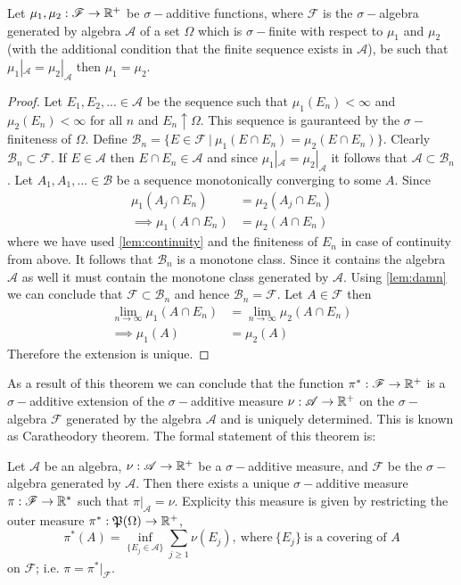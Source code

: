  \begin{theorem}
   Let $\mu_1, \mu_2: \mathscr{F} \to \mathbb{R}^+$ be $\sigma-$additive functions, where $ \mathscr{F}$ is the $\sigma-$algebra generated by algebra $ \mathscr{A}$ of a set $\Omega$ which is $\sigma-$finite with respect to $\mu_1$ and $\mu_2$ (with the additional condition that the finite sequence exists in $ \mathscr{A}$), be such that $\mu_1|_{ \mathscr{A}} = \mu_2|_{ \mathscr{A}}$ then $\mu_1 = \mu_2$. 
 \end{theorem}
 \begin{proof}
   Let $E_1, E_2,... \in \mathscr{A}$ be the sequence such that $\mu_1(E_n)<\infty$ and $\mu_2(E_n)<\infty$ for all $n$ and $E_n \uparrow \Omega$. This sequence is gauranteed by the $\sigma-$finiteness of $\Omega$. Define $ \mathscr{B}_n = \{E \in \mathscr{F}\ |\ \mu_1(E\cap E_n) = \mu_2(E\cap E_n)\}$. Clearly $ \mathscr{B}_n \subset \mathscr{F}$. If $E \in \mathscr{A}$ then $E\cap E_n \in \mathscr{A}$ and since $\mu_1|_{ \mathscr{A}} = \mu_2|_{ \mathscr{A}}$ it follows that $ \mathscr{A} \subset \mathscr{B}_n$. Let $A_1,A_1,...\in \mathscr{B}$ be a sequence monotonically converging to some $A$. Since
   \begin{align*}
     \mu_1(A_j\cap E_n) &= \mu_2(A_j\cap E_n)\\
     \implies \mu_1(A\cap E_n) &= \mu_2(A\cap E_n)
   \end{align*}
   where we have used \cref{lem:continuity} and the finiteness of $E_n$ in case of continuity from above. It follows that $ \mathscr{B}_n$ is a monotone class. Since it contains the algebra $ \mathscr{A}$ as well it must contain the monotone class generated by $ \mathscr{A}$. Using \cref{lem:damn} we can conclude that $ \mathscr{F}\subset \mathscr{B}_n$ and hence $ \mathscr{B}_n = \mathscr{F}$. Let $A\in \mathscr{F}$ then
   \begin{align*}
     \lim_{n\to \infty}\mu_1(A\cap E_n) &= \lim_{n\to\infty}\mu_2(A\cap E_n)\\
     \implies \mu_1(A) &= \mu_2(A)
   \end{align*}
   Therefore the extension is unique.
 \end{proof}
 As a result of this theorem we can conclude that the function $\pi^*: \mathscr{F}\to\mathbb{R}^+$ is a $\sigma-$additive extension  of the $\sigma-$additive measure $\nu: \mathscr{A}\to \mathbb{R}^+$ on the $\sigma-$algebra $ \mathscr{F}$ generated by the algebra $ \mathscr{A}$ and is uniquely determined. This is known as Caratheodory theorem. The formal statement of this theorem is:
 \begin{theorem}\label{thm:caratheodory}
   Let $ \mathscr{A}$ be an algebra, $\nu: \mathscr{A}\to \mathbb{R}^+$ be a $\sigma-$additive measure, and $ \mathscr{F}$ be the $\sigma-$algebra generated by $ \mathscr{A}$. Then there exists a unique $\sigma-$additive measure $\pi: \mathscr{F} \to \mathbb{R}^*$ such that $\pi|_{ \mathscr{A}} = \nu$. Explicity this measure is given by restricting the outer measure $\pi^*: \mathfrak{P} (\Omega) \to \mathbb{R}^+$,
   \[\pi^*(A) = \inf_{\{E_j\in \mathscr{A}\}} \sum_{j\geq 1} \nu(E_j),\ \text{where}\ \{E_j\}\ \text{is a covering of $A$}\]
   on $ \mathscr{F}$; i.e. $\pi = \pi^*|_{ \mathscr{F}}$. 
 \end{theorem}
